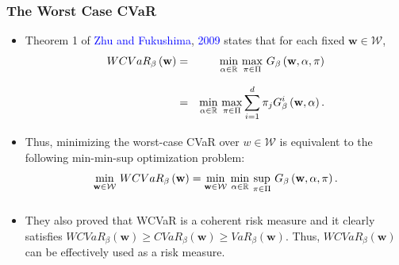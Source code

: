 \documentclass[pdf,10pt,xcolor=dvipsnames,hide notes]{beamer}
\begin{document}
\begin{frame}[label=frame2f]
	\frametitle{The Worst Case CVaR}
	
	\begin{itemize}
		\justifying
		
		\item Theorem 1 of 	\textcolor{blue}{Zhu and Fukushima}, \textcolor{blue}{2009} states that for each fixed $%
		\mathbf{w}\in \mathcal{W}$,
		\begin{eqnarray}
		WCVaR_{\beta }\left( \mathbf{w}\right) &=&\underset{}{\underset{\alpha \in
				\mathbb{R}
			}{\min }~\underset{\pi \in \Pi }{\max }}~G_{\beta }\left( \mathbf{w},\alpha
		,\pi \right)  \notag \\
		&=&\underset{}{\underset{\alpha \in
				\mathbb{R}
			}{\min }~\underset{\pi \in \Pi }{\max }}\sum_{i=1}^{d}\pi _{j}G_{\beta
		}^{i}\left( \mathbf{w},\alpha \right) .  \label{18}
		\end{eqnarray}%
		
	\vspace{0.3cm}
		
	\item Thus, minimizing the worst-case CVaR over $w\in \mathcal{W}$ is equivalent
		to the following min-min-sup optimization problem:
		\begin{equation}
		\underset{}{\underset{\mathbf{w}\in \mathcal{W}}{\min }}~WCVaR_{\beta
		}\left( \mathbf{w}\right) =\underset{}{\underset{\mathbf{w}\in \mathcal{W}}{%
				\min }~\underset{\alpha \in
				\mathbb{R}
			}{\min }~\underset{\pi \in \Pi }{\sup }}~G_{\beta }\left( \mathbf{w},\alpha
		,\pi \right) .  \label{19}
		\end{equation}%
		
		\vspace{0.3cm}
		
		
		\item They also proved that WCVaR is a coherent risk measure and
		it clearly satisfies $WCVaR_{\beta }\left( \mathbf{w}\right) \geq
		CVaR_{\beta }\left( \mathbf{w}\right) \geq VaR_{\beta }\left( \mathbf{w}%
		\right) $. Thus, $WCVaR_{\beta }\left( \mathbf{w}\right) $ can be
		effectively used as a risk measure.
		
	\end{itemize}
	
	\end{frame}
\end{document}
